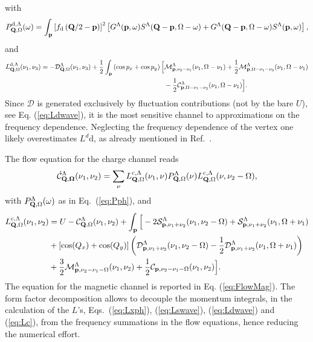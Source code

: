 \begin{widetext}
\begin{equation}
\label{eq:dwaveflow}
\end{equation}
with
\begin{equation}
 P^{\mathrm{d},\Lambda}_{\mathbf{Q},\Omega}(\omega) =
 \int_{\mathbf{p}} \left[ f_{\mathrm{d}}\left( \mathbf{Q}/2 - \mathbf{p} \right) \right]^2 
\left[ G^{\Lambda}(\mathbf{p},\omega)S^{\Lambda}(\mathbf{Q}-\mathbf{p},\Omega-\omega) +G^{\Lambda}(\mathbf{Q}-\mathbf{p},\Omega-\omega)
S^{\Lambda}(\mathbf{p},\omega) \right], 
\label{eq:app:P_pp_d}
\end{equation} 
and
\begin{align} 
\label{eq:Ldwave}
 L^{\mathrm{d},\Lambda}_{\mathbf{Q},\Omega}(\nu_1,\nu_3) =
 -\mathcal{D}^{\Lambda}_{\mathbf{Q},\Omega}(\nu_1,\nu_3)
 + \frac{1}{2}\int_{\mathbf{p}} \left(\cos{p_x}+\cos{p_y}\right) \Big[ 
 & \mathcal{M}^{\Lambda}_{\mathbf{p},\nu_3-\nu_1}(\nu_1,\Omega-\nu_1) 
 + \frac{1}{2} \mathcal{M}^{\Lambda}_{\mathbf{p},\Omega-\nu_1-\nu_3}(\nu_1,\Omega-\nu_1)
 \\ \nonumber
 & - \frac{1}{2} \mathcal{C}^{\Lambda}_{\mathbf{p},\Omega-\nu_1-\nu_3}(\nu_1,\Omega-\nu_1) \Big].
\end{align} 
Since $\mathcal{D}$ is generated exclusively by fluctuation contributions (not by the bare $U$), see Eq. (\ref{eq:Ldwave}), it is the most sensitive channel to approximations on the frequency dependence.  
Neglecting the frequency dependence of the vertex one likely overestimates $L^d{\mathrm{d}}$, as already mentioned in Ref.~.

The flow equation for the charge channel reads
\begin{equation}
\dot{\mathcal{C}}^{\Lambda}_{\mathbf{Q,\Omega}}(\nu_1,\nu_2) = \sum_\nu
 L^{\mathrm{c},\Lambda}_{\mathbf{Q},\Omega}(\nu_1,\nu) P^{\Lambda}_{\mathbf{Q},\Omega}(\nu) 
 L^{\mathrm{c},\Lambda}_{\mathbf{Q},\Omega}(\nu,\nu_2-\Omega), 
\end{equation} 	   
with $P^{\Lambda}_{\mathbf{Q},\Omega}(\omega)$ as in Eq.~(\ref{eq:Pph}), and
\begin{align}  
 L^{\mathrm{c},\Lambda}_{\mathbf{Q},\Omega}(\nu_1,\nu_2) & =
 U - \mathcal{C}^{\Lambda}_{\mathbf{Q},\Omega}(\nu_1,\nu_2)
 + \int_{\mathbf{p}} \Big [
 - 2 \mathcal{S}^{\Lambda}_{\mathbf{p},\nu_1+\nu_2}(\nu_1,\nu_2-\Omega) + \mathcal{S}^{\Lambda}_{\mathbf{p},\nu_1+\nu_2}(\nu_1,\Omega+\nu_1)
 \nonumber \\ 
 & +  [\cos(Q_x)+\cos(Q_y)]\left( \mathcal{D}^{\Lambda}_{\mathbf{p},\nu_1+\nu_2}(\nu_1,\nu_2-\Omega) -\frac{1}{2} \mathcal{D}^{\Lambda}_{\mathbf{p},\nu_1+\nu_2}(\nu_1,\Omega+\nu_1) \right)
 \nonumber \\
 & + \frac{3}{2} \mathcal{M}^{\Lambda}_{\mathbf{p},\nu_2-\nu_1-\Omega}(\nu_1,\nu_2)
 + \frac{1}{2} \mathcal{C}_{\mathbf{p},\nu_2-\nu_1-\Omega}(\nu_1,\nu_2) \Big] .
 \label{eq:Lc}
\end{align}
The equation for the magnetic channel is reported in Eq. (\ref{eq:FlowMag}).
The form factor decomposition allows to decouple the momentum integrals, in the calculation of the $L$'s, Eqs.~(\ref{eq:Lxph}), (\ref{eq:Lswave}), (\ref{eq:Ldwave}) and (\ref{eq:Lc}), from the frequency summations in the flow equations, hence reducing the numerical effort.   	 


\end{widetext}
